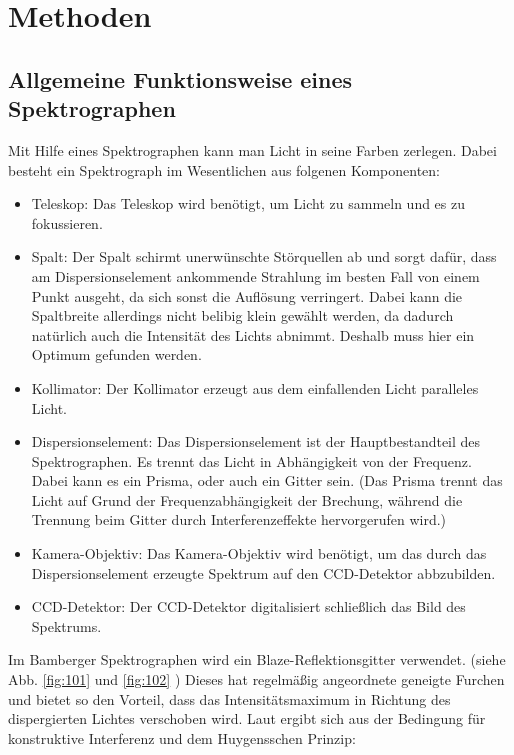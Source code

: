 \section{Methoden}

\subsection{Allgemeine Funktionsweise eines Spektrographen}
Mit Hilfe eines Spektrographen kann man Licht in seine Farben zerlegen. Dabei besteht ein Spektrograph im Wesentlichen aus folgenen Komponenten:

\begin{itemize}

\item Teleskop: Das Teleskop wird benötigt, um Licht zu sammeln und es zu fokussieren.

\item Spalt: Der Spalt schirmt unerwünschte Störquellen ab und sorgt dafür, dass am Dispersionselement ankommende Strahlung im besten Fall von einem Punkt ausgeht, da sich sonst die Auflösung verringert. Dabei kann die Spaltbreite allerdings nicht belibig klein gewählt  werden, da dadurch natürlich auch die Intensität des Lichts abnimmt. Deshalb muss hier ein Optimum gefunden werden.

\item Kollimator: Der Kollimator erzeugt aus dem einfallenden Licht paralleles Licht.

\item Dispersionselement: Das Dispersionselement ist der Hauptbestandteil des Spektrographen. Es trennt das Licht in Abhängigkeit von der Frequenz. Dabei kann es ein Prisma, oder auch ein Gitter sein. (Das Prisma trennt das Licht auf Grund der Frequenzabhängigkeit der Brechung, während die Trennung beim Gitter durch Interferenzeffekte hervorgerufen wird.)

\item Kamera-Objektiv: Das Kamera-Objektiv wird benötigt, um das durch das Dispersionselement erzeugte Spektrum auf den CCD-Detektor abbzubilden.

\item CCD-Detektor: Der CCD-Detektor digitalisiert schließlich das Bild des Spektrums.

\end{itemize}
Im Bamberger Spektrographen wird ein Blaze-Reflektionsgitter verwendet. (siehe Abb. \ref{fig:101} und \ref{fig:102} ) Dieses hat regelmäßig angeordnete geneigte Furchen und bietet so den Vorteil, dass das Intensitätsmaximum in Richtung des dispergierten Lichtes verschoben wird. Laut \cite{ronomischesPraktikum} ergibt sich aus der Bedingung für konstruktive Interferenz und dem Huygensschen Prinzip:

